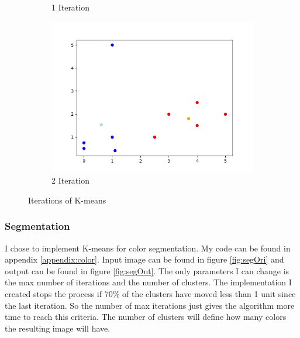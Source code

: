 \documentclass{article}
\begin{document}
\begin{figure}[H]
\begin{subfigure}{0.32\textwidth}
            \caption{1 Iteration}
            \label{fig:sub:k1}
        \end{subfigure}  
        \begin{subfigure}{0.32\textwidth}
            \centering
            \includegraphics[width=1\textwidth]{k2.png}
            \caption{2 Iteration}
            \label{fig:sub:k2}
        \end{subfigure} 
        \caption{Iterations of K-means} 
        \label{fig:kMeansIter} 
    \end{figure}
    \subsubsection{Segmentation}
    I chose to implement K-means for color segmentation. My code can be found in appendix \ref{appendix:color}. Input image can be found in figure \ref{fig:segOri} and output can be found in figure \ref{fig:segOut}. The only parameters I can change is the max number of iterations and the number of clusters. The implementation I created stops the process if 70\% of the clusters have moved less than 1 unit since the last iteration. So the number of max iterations just gives the algorithm more time to reach this criteria. The number of clusters will define how many colors the resulting image will have.
\end{document}
